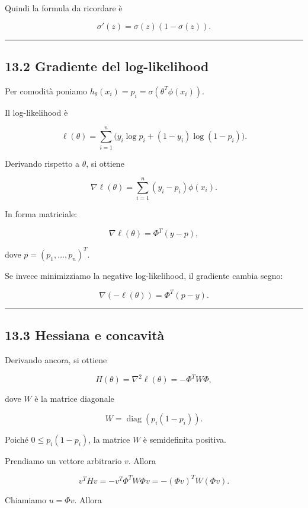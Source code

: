 \documentclass{article}
\begin{document}
Quindi la formula da ricordare è

\[
\sigma'(z)=\sigma(z)(1-\sigma(z)).
\]

\begin{center}\rule{0.5\linewidth}{0.5pt}\end{center}

\subsection{13.2 Gradiente del
log-likelihood}\label{gradiente-del-log-likelihood}

Per comodità poniamo \(h_\theta(x_i)=p_i=\sigma(\theta^T\phi(x_i))\).

Il log-likelihood è

\[
\ell(\theta)=\sum_{i=1}^n\Big(y_i\log p_i + (1-y_i)\log(1-p_i)\Big).
\]

Derivando rispetto a \(\theta\), si ottiene

\[
\nabla \ell(\theta)
=
\sum_{i=1}^n (y_i-p_i)\phi(x_i).
\]

In forma matriciale:

\[
\nabla \ell(\theta)=\Phi^T(y-p),
\]

dove \(p=(p_1,\dots,p_n)^T\).

Se invece minimizziamo la negative log-likelihood, il gradiente cambia
segno:

\[
\nabla(-\ell(\theta))=\Phi^T(p-y).
\]

\begin{center}\rule{0.5\linewidth}{0.5pt}\end{center}

\subsection{13.3 Hessiana e concavità}\label{hessiana-e-concavituxe0}

Derivando ancora, si ottiene

\[
H(\theta)=\nabla^2 \ell(\theta)
=
-\Phi^T W \Phi,
\]

dove \(W\) è la matrice diagonale

\[
W = \operatorname{diag}(p_i(1-p_i)).
\]

Poiché \(0\le p_i(1-p_i)\), la matrice \(W\) è semidefinita positiva.

Prendiamo un vettore arbitrario \(v\). Allora

\[
v^THv
=
-v^T\Phi^T W \Phi v
=
-(\Phi v)^T W (\Phi v).
\]

Chiamiamo \(u=\Phi v\). Allora
\end{document}
